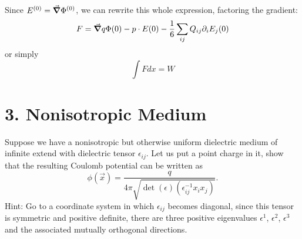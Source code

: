 \documentclass[a4paper,twoside]{article}
\begin{document}
\begin{tcolorbox}[breakable]
    Since $ E^{(0)} = \grad{\Phi^{(0)}} $, we can rewrite this whole expression, factoring the gradient:
    \begin{equation}
        F = \grad{q\Phi(0) - p \cdot E(0) - \frac{1}{6} \sum_{ij} Q_{ij} \partial_i E_j(0)}
    \end{equation}
    or simply
    \begin{equation}
        \int F dx = W
    \end{equation}

\end{tcolorbox}

\section*{3. Nonisotropic Medium}
Suppose we have a nonisotropic but otherwise uniform dielectric medium of infinite extend with dielectric tensor $ \epsilon_{ij} $. Let us put a point charge in it, show that the resulting Coulomb potential can be written as
\begin{equation}
    \phi( \vec{x} ) = \frac{q}{4 \pi \sqrt{\det(\epsilon)(\epsilon_{ij}^{-1}x_ix_j)}}.
\end{equation}
Hint: Go to a coordinate system in which $ \epsilon_{ij} $ becomes diagonal, since this tensor is symmetric and positive definite, there are three positive eigenvalues $ \epsilon^1 $, $ \epsilon^2 $, $ \epsilon^3 $ and the associated mutually orthogonal directions.
\end{document}
